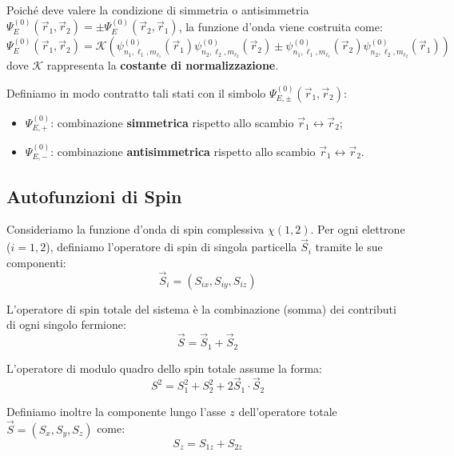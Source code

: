 Poiché deve valere la condizione di simmetria o antisimmetria \(\Psi_E^{(0)}(\vec{r}_1, \vec{r}_2) = \pm \Psi_E^{(0)}(\vec{r}_2, \vec{r}_1)\), la funzione d'onda viene costruita come:
\begin{equation}
    \Psi_E^{(0)}(\vec{r}_1, \vec{r}_2) = \mathcal{K} \left( \psi_{n_1, \ell_1, m_{\ell_1}}^{(0)}(\vec{r}_1) \psi_{n_2, \ell_2, m_{\ell_2}}^{(0)}(\vec{r}_2) \pm \psi_{n_1, \ell_1, m_{\ell_1}}^{(0)}(\vec{r}_2) \psi_{n_2, \ell_2, m_{\ell_2}}^{(0)}(\vec{r}_1) \right)
\end{equation}
dove \(\mathcal{K}\) rappresenta la \textbf{costante di normalizzazione}.

Definiamo in modo contratto tali stati con il simbolo \(\Psi_{E, \pm}^{(0)}(\vec{r}_1, \vec{r}_2)\):
\begin{itemize}
    \item \(\Psi_{E, +}^{(0)}\): combinazione \textbf{simmetrica} rispetto allo scambio \(\vec{r}_1 \leftrightarrow \vec{r}_2\);
    \item \(\Psi_{E, -}^{(0)}\): combinazione \textbf{antisimmetrica} rispetto allo scambio \(\vec{r}_1 \leftrightarrow \vec{r}_2\).
\end{itemize}

\subsection{Autofunzioni di Spin}

Consideriamo la funzione d'onda di spin complessiva \(\chi(1, 2)\). Per ogni elettrone (\(i=1,2\)), definiamo l'operatore di spin di singola particella \(\vec{S}_i\) tramite le sue componenti:
\begin{equation}
    \vec{S}_i = (S_{ix}, S_{iy}, S_{iz})
\end{equation}

L'operatore di spin totale del sistema è la combinazione (somma) dei contributi di ogni singolo fermione:
\begin{equation}
    \vec{S} = \vec{S}_1 + \vec{S}_2
\end{equation}

L'operatore di modulo quadro dello spin totale assume la forma:
\begin{equation}
    S^2 = S_1^2 + S_2^2 + 2\vec{S}_1 \cdot \vec{S}_2
\end{equation}

Definiamo inoltre la componente lungo l'asse \(z\) dell'operatore totale \(\vec{S} = (S_x, S_y, S_z)\) come:
\begin{equation}
    S_z = S_{1z} + S_{2z}
\end{equation}

